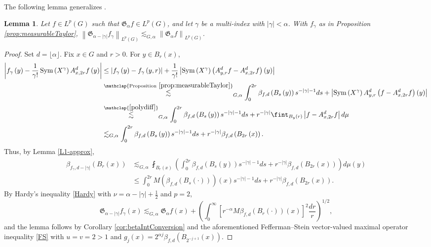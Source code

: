 \documentclass[11pt,reqno]{amsart}
\newtheorem{lemma}[theorem]{Lemma}
\newcommand{\1}{\mathbf 1}
\begin{document}
The following lemma generalizes \cite[Lemma 1]{dorronsoro1985characterization}.
\begin{lemma}\label{lem:inductOnG}
Let $f\in L^p\left(G\right)$ such that $\mathfrak{G}_\alpha f\in L^p\left(G\right)$, and let $\gamma$ be a multi-index with $\left|\gamma\right|<\alpha$. With $f_\gamma$ as in Proposition \ref{prop:measurableTaylor}, $\left\|\mathfrak{G}_{\alpha-\left|\gamma\right|}f_\gamma\right\|_{L^p\left(G\right)}\lesssim_{G,\alpha} \left\|\mathfrak{G}_\alpha f\right\|_{L^p\left(G\right)}$.
\end{lemma}
\begin{proof}


Set $d=\lfloor \alpha\rfloor$. Fix $x\in G$ and $r>0$. For $y\in B_r\left(x\right)$,
\begin{align*}
\left|f_\gamma\left(y\right)-\frac{1}{\gamma!}\operatorname{Sym}\left(X^\gamma\right) A^d_{x,2r}f\left(y\right)\right|&\le \left|f_\gamma\left(y\right)-f_\gamma \left(y,r\right)\right|+\frac{1}{\gamma!}\left|\operatorname{Sym}\left(X^\gamma\right) \left(A^d_{y,r}f-A^d_{x,2r}f\right)\left(y\right)\right| \\
&\stackrel{\mathclap{\mathrm{Proposition~}\ref{prop:measurableTaylor}}}{\lesssim}_{G,\alpha} \int_0^{2r} \beta_{f,d}\left(B_s\left(y\right)\right)s^{-\left|\gamma\right|-1}ds+\left|\operatorname{Sym}\left(X^\gamma\right) A^d_{y,r}\left(f-A^d_{x,2r}f\right)\left(y\right)\right|\\
&\stackrel{\mathclap{\eqref{polydiff}}}{\lesssim}_{G,\alpha} \int_0^{2r} \beta_{f,d}\left(B_s\left(y\right)\right)s^{-\left|\gamma\right|-1}ds+r^{-\left|\gamma\right|}\fint_{B_y\left(r\right)}\left|f-A^d_{x,2r}f\right|d\mu\\
&\lesssim_{G,\alpha} \int_0^{2r} \beta_{f,d}\left(B_s\left(y\right)\right)s^{-\left|\gamma\right|-1}ds+r^{-\left|\gamma\right|}\beta_{f,d}\left(B_{2r}\left(x\right)\right).
\end{align*}
Thus, by Lemma \ref{L1-approx},
\begin{align*}
\beta_{f_\gamma,d-\left|\gamma\right|}\left(B_r\left(x\right)\right)&\lesssim_{G,\alpha} \fint_{B_{r}\left(x\right)}\left(\int_0^{2r} \beta_{f,d}\left(B_s\left(y\right)\right)s^{-\left|\gamma\right|-1}ds+r^{-\left|\gamma\right|}\beta_{f,d}\left(B_{2r}\left(x\right)\right)\right)d\mu\left(y\right)\\
&\le \int_0^{2r} M\left(\beta_{f,d}\left(B_s\left(\cdot\right)\right)\right)\left(x\right)s^{-\left|\gamma\right|-1}ds+r^{-\left|\gamma\right|}\beta_{f,d}\left(B_{2r}\left(x\right)\right).
\end{align*}
By Hardy's inequality \eqref{Hardy} with $\nu=\alpha-\left|\gamma\right|+\frac 12$ and $p=2$,
\[
\mathfrak{G}_{\alpha-\left|\gamma\right|}f_\gamma\left(x\right)\lesssim_{G,\alpha} \mathfrak{G}_\alpha f\left(x\right)+\left(\int_0^\infty \left[r^{-\alpha}M\beta_{f,d}\left(B_r\left(\cdot\right)\right)\left(x\right)\right]^2\frac{dr}{r}\right)^{1/2},
\]
and the lemma follows by Corollary \ref{cor:betaIntConversion} and the aforementioned Fefferman--Stein vector-valued maximal operator inequality \eqref{FS} with $u=v=2>1$ and $g_j\left(x\right)=2^{\alpha j}\beta_{f,d}\left(B_{2^{-j+1}}\left(x\right)\right)$.
\end{proof}
\end{document}
